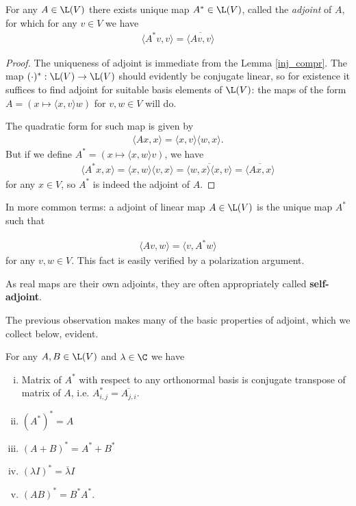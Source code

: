 \begin{lause}
	For any $A \in \L(V)$ there exists unique map $A^{*} \in \L(V)$, called the \textit{adjoint} of $A$, for which for any $v \in V$ we have
	\begin{align*}
	\langle A^{*} v, v\rangle = \overline{\langle A v, v \rangle}
	\end{align*}
\end{lause}
\begin{proof}
	The uniqueness of adjoint is immediate from the Lemma \ref{inj_compr}. The map $(\cdot)^{*} : \L(V) \to \L(V)$ should evidently be conjugate linear, so for existence it suffices to find adjoint for suitable basis elements of $\L(V)$: the maps of the form $A = (x \mapsto \langle x, v \rangle w)$ for $v, w \in V$ will do.

	The quadratic form for such map is given by
	\begin{align*}
		\langle A x, x \rangle = \langle x, v \rangle \langle w, x \rangle.
	\end{align*}
	But if we define $A^{*} = (x \mapsto \langle x, w \rangle v)$, we have
	\begin{align*}
		\langle A^{*} x, x \rangle = \langle x, w \rangle \langle v, x \rangle = \overline{\langle w, x \rangle \langle x, v \rangle} = \overline{\langle A x, x \rangle}
	\end{align*}
	for any $x \in V$, so $A^{*}$ is indeed the adjoint of $A$.
\end{proof}

In more common terms: a adjoint of linear map $A \in \L(V)$ is the unique map $A^{*}$ such that

\begin{align}\label{adjoint_common}
	\langle A v, w \rangle = \langle v, A^{*} w \rangle
\end{align}
for any $v, w \in V$. This fact is easily verified by a polarization argument.

As real maps are their own adjoints, they are often appropriately called \textbf{self-adjoint}.

The previous observation makes many of the basic properties of adjoint, which we collect below, evident.

\begin{lause}\label{basic_adjoint}
	For any $A, B \in \L(V)$ and $\lambda \in \C$ we have
	\begin{enumerate}[i)]
		\item Matrix of $A^{*}$ with respect to any orthonormal basis is conjugate transpose of matrix of $A$, i.e. $A^{*}_{i, j} = \overline{A_{j, i}}$.
		\item $(A^{*})^{*} = A$
		\item $(A + B)^{*} = A^{*} + B^{*}$
		\item $(\lambda I)^{*} = \overline{\lambda} I$
		\item $(AB)^{*} = B^{*}A^{*}$.
	\end{enumerate}
\end{lause}

